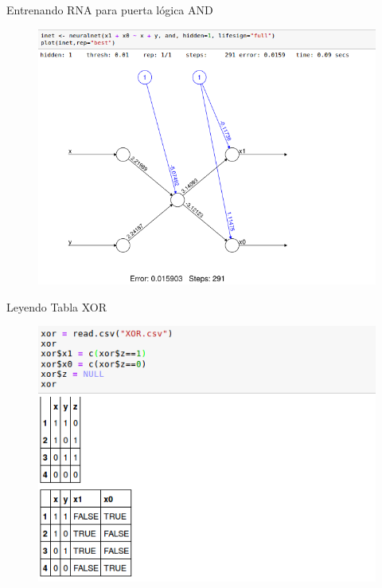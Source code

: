 \documentclass{beamer}
\begin{document}
\begin{frame}
\begin{block}{Entrenando RNA para puerta lógica AND}
\begin{figure}
\includegraphics[scale=0.4]{neuralnetand.png}
\centering
\end{figure}
\end{block}
\end{frame}

\begin{frame}
\begin{block}{Leyendo Tabla XOR}
\begin{figure}
\includegraphics[scale=0.4]{readxor.png}
\centering
\end{figure}
\end{block}
\end{frame}
\end{document}
